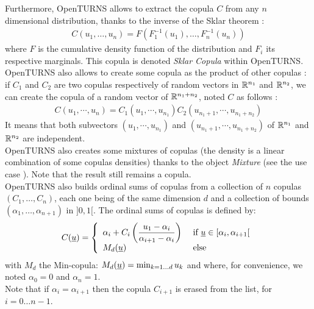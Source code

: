 Furthermore, OpenTURNS allows to extract the copula $C$ from any $n$ dimensional distribution, thanks to the inverse of the Sklar theorem :
\begin{align*}
  C(u_1, \dots, u_n) = F(F_1^{-1}(u_1), \dots, F_n^{-1}(u_n))
\end{align*}
where $F$ is the cumulative density function of the distribution and $F_i$ its respective marginals. This copula is denoted \emph{Sklar Copula} within OpenTURNS.\\

OpenTURNS also allows to create some copula as the product of other copulas : if $C_1$ and $C_2$ are two copulas respectively of random vectors in  ${\mathbb R}^{n_1}$ and ${\mathbb R}^{n_2}$, we can create the copula of a random vector of ${\mathbb R}^{n_1+n_2}$, noted $C$ as follows :
\begin{align*}
  C(u_1, \cdots, u_n) = C_1(u_1, \cdots, u_{n_1}) C_2(u_{n_1+1}, \cdots, u_{n_1+n_2})
\end{align*}
It means that both subvectors $(u_1, \cdots, u_{n_1})$ and $(u_{n_1+1}, \cdots, u_{n_1+n_2})$ of ${\mathbb R}^{n_1}$ and ${\mathbb R}^{n_2}$ are independent.\\

OpenTURNS also creates some mixtures of copulas (the density is a linear combination of some copulas densities) thanks to the object {\itshape Mixture} (see the use case \label{Mixture}). Note that the result still remains a copula.\\

OpenTURNS also builds ordinal sums of copulas from a collection of $n$ copulas $(C_1, \dots, C_n)$, each one being of the same dimension $d$ and a collection of bounds $(\alpha_1, \dots, \alpha_{n+1})$ in $]0,1[$. The ordinal sums of copulas is defined by:
\begin{equation}
 C({\underline{u}}) = \left\{
    \begin{array}{ll}
       \alpha_i+C_i \left( \dfrac{u_1-\alpha_i}{\alpha_{i+1} - \alpha_i} \right) & \mbox{ if } {\underline{u}} \in [\alpha_i, \alpha_{i+1}[ \\
       M_d({\underline{u}}) & \mbox{ else } 
    \end{array}
    \right.
\end{equation}
with $M_d$ the Min-copula: $M_d({\underline{u}}) = \min_{k=1 \dots d} u_k$ and where, for convenience, we noted $\alpha_0=0$ and $\alpha_n=1$.\\
Note that if  $\alpha_i=\alpha_{i+1}$ then the copula $C_{i+1}$ is erased from the list, for $i=0 \dots n-1$.




